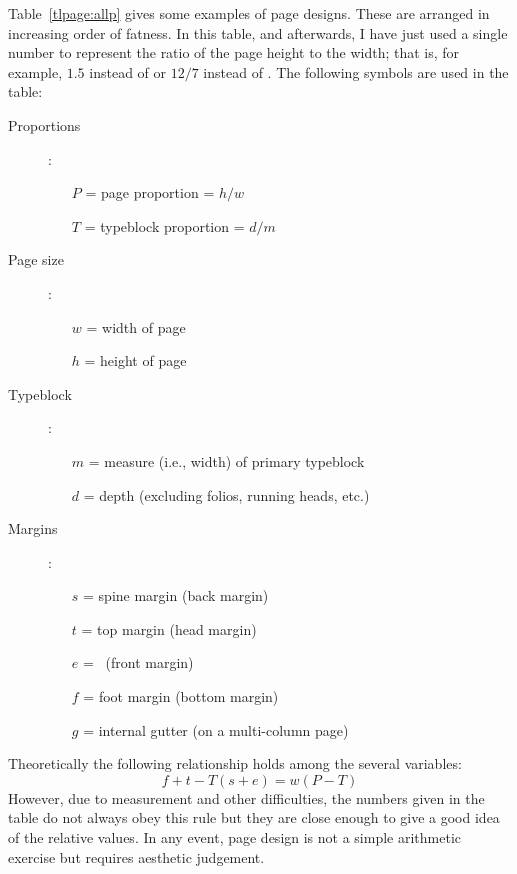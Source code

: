 \documentclass[10pt,a4paper,extrafontsizes]{memoir}
\begin{document}
\begin{paracol}{2}
\switchEng
  Table~\ref{tlpage:allp} gives some examples of 
page designs. These are arranged in increasing order of
fatness. In this table, and afterwards, I have just used a single number
to represent the ratio of the page height to the width; that is, for example,
$1.5$ instead of  or $12/7$ instead of .
The following symbols are used in the table:
\begin{description}
\item[Proportions]:
  \begin{itemize}
  \item[$P$] = page proportion = $h/w$
  \item[$T$] = typeblock proportion = $d/m$
  \end{itemize}
\item[Page size]:
  \begin{itemize}
  \item[$w$] = width of page
  \item[$h$] = height of page
  \end{itemize}
\item[Typeblock]:
  \begin{itemize}
  \item[$m$] = measure (i.e., width) of primary typeblock
  \item[$d$] = depth (excluding folios, running heads, etc.)
  \end{itemize}
\item[Margins]:
  \begin{itemize}
  \item[$s$] = spine margin (back margin)
  \item[$t$] = top margin (head margin)
  \item[$e$] = \foredge\ (front margin)
  \item[$f$] = foot margin (bottom margin)
  \item[$g$] = internal gutter (on a multi-column page)
  \end{itemize}
\end{description}

    Theoretically the following relationship holds among the several
variables:
\begin{displaymath}
f + t - T(s + e) = w(P - T)
\end{displaymath}
However, due to measurement and other difficulties, the numbers given in 
the table do not always obey this rule but they are close enough to give
a good idea of the relative values. In any event, page design is not a
simple arithmetic exercise but requires aesthetic judgement.


\end{paracol}
\end{document}
